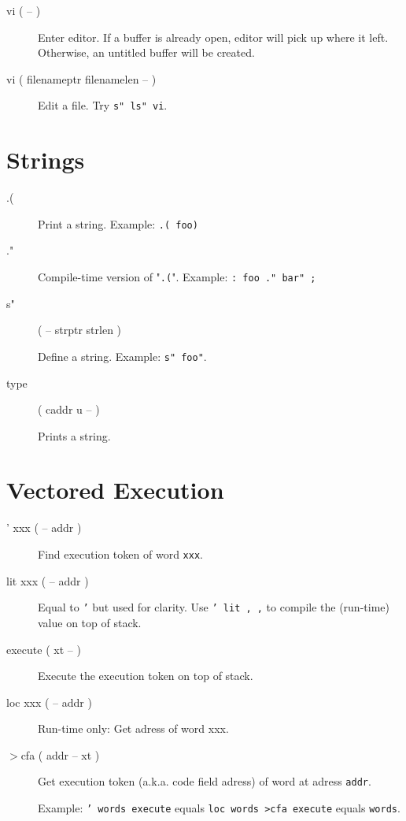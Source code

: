 \begin{description}
\item[vi ( -- )]

Enter editor. If a buffer is already open, editor will pick up where it left.
Otherwise, an untitled buffer will be created.

\end{description}

\begin{description}
\item[vi ( filenameptr filenamelen -- )]

Edit a file. Try \texttt{s" ls" vi}.

\end{description}

\section{Strings}

\begin{description}
\item[.(]

Print a string. Example: \texttt{.( foo)}

\item[."]

Compile-time version of "\texttt{.(}". Example: \texttt{: foo ." bar" ;}

\item[s"] ( -- strptr strlen )

Define a string. Example: \texttt{s" foo"}. 

\item[type] ( caddr u -- )

Prints a string.

\end{description}

\section{Vectored Execution}

\begin{description}
\item[' xxx ( -- addr )] Find execution token of word \texttt{xxx}.
\item[lit xxx ( -- addr )] Equal to \texttt{'} but used for clarity. Use \texttt{' lit , ,} to compile the (run-time) value on top of stack.
\item[execute ( xt -- )] Execute the execution token on top of stack.
\item[loc xxx ( -- addr )] Run-time only: Get adress of word xxx.
\item[$>$cfa ( addr -- xt )] Get execution token (a.k.a. code field adress) of word at adress \texttt{addr}.

Example: \texttt{' words execute} equals \texttt{loc words >cfa execute} equals \texttt{words}.
\end{description}


